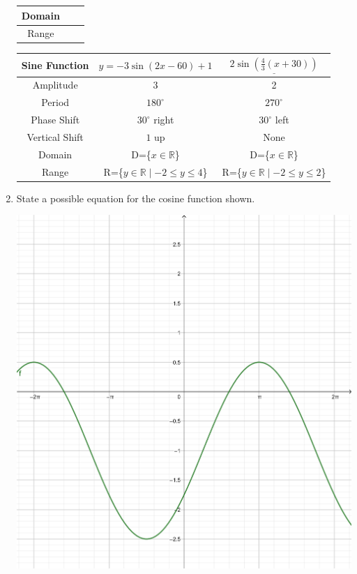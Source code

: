 \documentclass[paper=a4, fontsize=11pt]{scrartcl}
\begin{document}
\begin{enumerate}[resume]
\begin{center}
\begin{tabular}{|c|c|c|}
            \hline
            Domain&&\\
            \hline
            Range&&\\
            \hline
        \end{tabular}
    \end{center}
    \begin{center}
        \begin{tabular}{|c|c|c|}
            \hline
            Sine Function&$y=-3\sin(2x-60)+1$&$\underline{2\sin(\frac{4}{3}(x+30))}$\\
            \hline
            Amplitude&3&2\\
            \hline
            Period&$180^\circ$&$270^\circ$\\
            \hline
            Phase Shift&$30^\circ$ right&$30^\circ $ left\\
            \hline
            Vertical Shift&$1$ up&None\\
            \hline
            Domain&D=\{$x\in\mathbb{R}$\}&D=\{${x\in\mathbb{R}}$\}\\
            \hline
            Range&R=\{$y\in\mathbb{R}\mid -2\le y \le 4$\}&R=\{$y\in\mathbb{R}\mid -2\le y \le 2$\}\\
            \hline
        \end{tabular}
    \end{center}
    \item State a possible equation for the cosine function shown.
    \begin{center}
        \includegraphics[scale=0.3]{MathExamReview/21-graph.png}

\end{center}
\end{enumerate}
\end{document}
